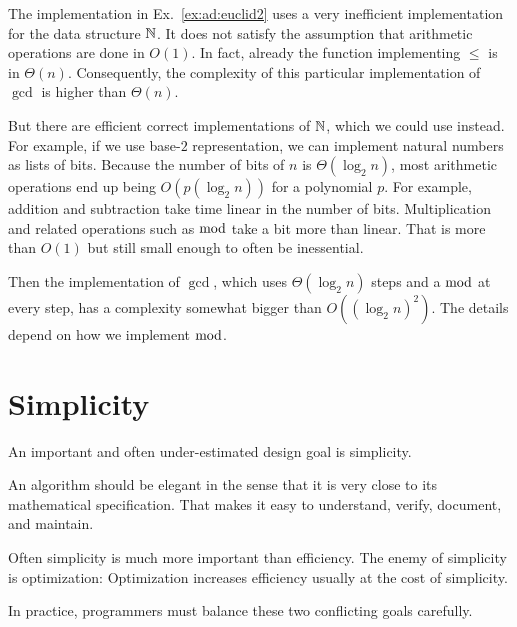 \begin{example}\label{ex:ad:euclid3}
The implementation in Ex.~\ref{ex:ad:euclid2} uses a very inefficient implementation for the data structure $\mathbb{N}$.
It does not satisfy the assumption that arithmetic operations are done in $O(1)$.
In fact, already the function implementing $\leq$ is in $\Theta(n)$.
Consequently, the complexity of this particular implementation of $\gcd$ is higher than $\Theta(n)$.
\medskip

But there are efficient correct implementations of $\mathbb{N}$, which we could use instead.
For example, if we use base-$2$ representation, we can implement natural numbers as lists of bits.
Because the number of bits of $n$ is $\Theta(\log_2 n)$, most arithmetic operations end up being $O(p(\log_2 n))$ for a polynomial $p$.
For example, addition and subtraction take time linear in the number of bits.
Multiplication and related operations such as $\mathop{\mathrm{mod}}$ take a bit more than linear.
That is more than $O(1)$ but still small enough to often be inessential.

Then the implementation of $\gcd$, which uses $\Theta(\log_2 n)$ steps and a $\mathop{\mathrm{mod}}$ at every step, has a complexity somewhat bigger than $O((\log_2 n)^2)$.
The details depend on how we implement $\mathop{\mathrm{mod}}$.
\end{example}

\section{Simplicity}

An important and often under-estimated design goal is simplicity.

An algorithm should be elegant in the sense that it is very close to its mathematical specification.
That makes it easy to understand, verify, document, and maintain.

Often simplicity is much more important than efficiency.
The enemy of simplicity is optimization: Optimization increases efficiency usually at the cost of simplicity.
\medskip

In practice, programmers must balance these two conflicting goals carefully.

